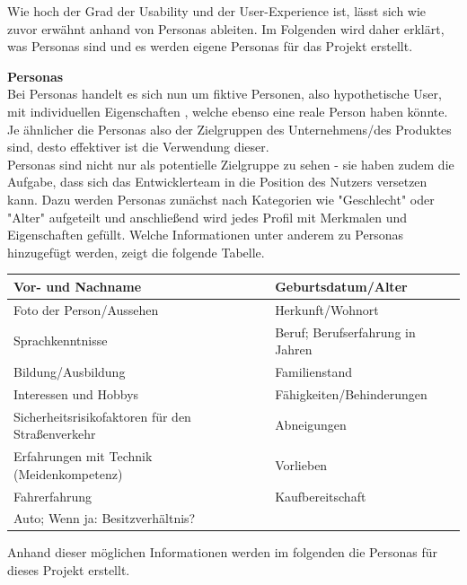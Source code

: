 Wie hoch der Grad der Usability und der User-Experience ist, lässt sich wie zuvor erwähnt anhand von Personas ableiten. Im Folgenden wird daher erklärt, was Personas sind und es werden eigene Personas für das Projekt erstellt.

\textbf{Personas}\label{personas}\\
Bei Personas handelt es sich nun um fiktive Personen, also hypothetische User, mit individuellen Eigenschaften \cite[]{seibert2008}, welche ebenso eine reale Person haben könnte. Je ähnlicher die Personas also der Zielgruppen des Unternehmens/des Produktes sind, desto effektiver ist die Verwendung dieser.\\
Personas sind nicht nur als potentielle Zielgruppe zu sehen - sie haben zudem die Aufgabe, dass sich das Entwicklerteam in die Position des Nutzers versetzen kann. Dazu werden Personas zunächst nach Kategorien wie "Geschlecht" oder "Alter"  aufgeteilt und anschließend wird jedes Profil mit Merkmalen und Eigenschaften gefüllt. Welche Informationen unter anderem zu Personas hinzugefügt werden, zeigt die folgende Tabelle.
\begin{center}
	\begin{tabular}{| l | l |}
		\hline
		\cellcolor{blue!25}Vor- und Nachname & \cellcolor{blue!25}Geburtsdatum/Alter\\
		\hline
		\cellcolor{blue!25}Foto der Person/Aussehen & \cellcolor{blue!25}Herkunft/Wohnort\\
		\hline
		\cellcolor{blue!25}Sprachkenntnisse & \cellcolor{red!25}Beruf; Berufserfahrung in Jahren\\
		\hline
		\cellcolor{blue!25}Bildung/Ausbildung & \cellcolor{blue!25}Familienstand\\
		\hline
		\cellcolor{red!25}Interessen und Hobbys & \cellcolor{red!25}Fähigkeiten/Behinderungen\\
		\hline
		\cellcolor{green!25}Sicherheitsrisikofaktoren für den Straßenverkehr &\cellcolor{green!25}Abneigungen\\
		\hline
		\cellcolor{green!25}Erfahrungen mit Technik (Meidenkompetenz) & 
		\cellcolor{green!25}Vorlieben \\
		\hline
		\cellcolor{green!25}Fahrerfahrung & \cellcolor{blue!25}Kaufbereitschaft\\
		\hline
		\cellcolor{green!25}Auto; Wenn ja: Besitzverhältnis? & \\
		\hline
	\end{tabular}
\end{center}
Anhand dieser möglichen Informationen werden im folgenden die Personas für dieses Projekt erstellt.
